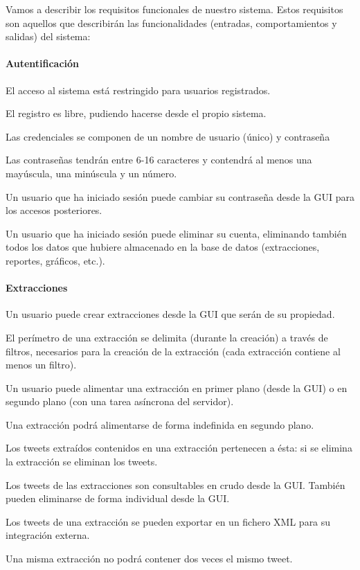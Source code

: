 
Vamos a describir los requisitos funcionales de nuestro sistema. Estos requisitos son aquellos que describirán las funcionalidades (entradas, comportamientos y salidas) del sistema:

\begin{functional}
\paragraph{Autentificación}
        \item El acceso al sistema está restringido para usuarios registrados.
        \begin{functional}
                \item El registro es libre, pudiendo hacerse desde el propio sistema.
                \item Las credenciales se componen de un nombre de usuario (único) y contraseña
        \end{functional}
        \item Las contraseñas tendrán entre 6-16 caracteres y contendrá al menos una mayúscula, una minúscula y un número.
        \item Un usuario que ha iniciado sesión puede cambiar su contraseña desde la GUI para los accesos posteriores.
        \item Un usuario que ha iniciado sesión puede eliminar su cuenta, eliminando también todos los datos que hubiere almacenado en la base de datos (extracciones, reportes, gráficos, etc.).

\paragraph{Extracciones}

	\item Un usuario puede crear extracciones desde la GUI que serán de su propiedad.
	\item El perímetro de una extracción se delimita (durante la creación) a través de filtros, necesarios para la creación de la extracción (cada extracción contiene al menos un filtro).
	\item  Un usuario puede alimentar una extracción en primer plano (desde la GUI) o en segundo plano (con una tarea asíncrona del servidor).
	\item Una extracción podrá alimentarse de forma indefinida en segundo plano.
	\item Los tweets extraídos contenidos en una extracción pertenecen a ésta: si se elimina la extracción se eliminan los tweets.
	\newpage
	\item Los tweets de las extracciones son consultables en crudo desde la GUI. También pueden eliminarse de forma individual desde la GUI.
	\item Los tweets de una extracción se pueden exportar en un fichero XML para su integración externa.
	\item Una misma extracción no podrá contener dos veces el mismo tweet.
	

\end{functional}
